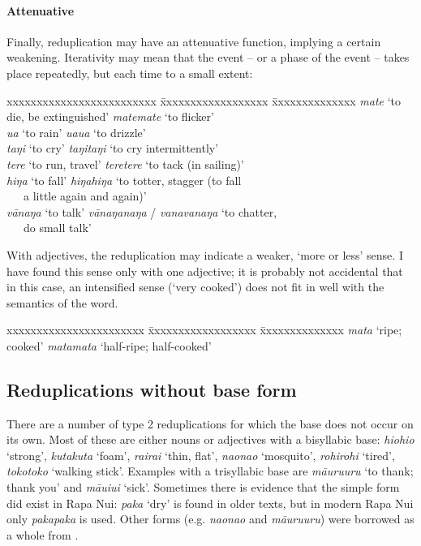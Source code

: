 \paragraph{Attenuative}\label{sec:2.6.2.2.7} Finally, reduplication may have an attenuative function, implying a certain weakening. Iterativity may mean that the event – or a phase of the event – takes place repeatedly, but each time to a small extent:
\ea 
\begin{tabbing}
 xxxxxxxxxxxxxxxxxxxxxxxxx \= xxxxxxxxxxxxxxxxxx \= xxxxxxxxxxxxxx \kill
  \textit{mate} ‘to die, be extinguished’ \> \textit{matemate} ‘to flicker’\\
  \textit{{\ꞌ}ua} ‘to rain’ \> \textit{{\ꞌ}ua{\ꞌ}ua} ‘to drizzle’\\
  \textit{taŋi} ‘to cry’ \> \textit{taŋitaŋi} ‘to cry intermittently’\\
  \textit{tere} ‘to run, travel’ \> \textit{teretere} ‘to tack (in sailing)’\\
  \textit{hiŋa} ‘to fall’  \>\textit{hiŋahiŋa} ‘to totter, stagger (to fall \\
 \> ~~~a little again and again)’\\
  \textit{vānaŋa} ‘to talk’ \> \textit{vānaŋanaŋa} / \textit{vanavanaŋa} ‘to chatter, \\
 \> ~~~do small talk’
\end{tabbing}
\z 
With adjectives, the reduplication may indicate a weaker, ‘more or less’ sense. I have found this sense only with one adjective; it is probably not accidental that in this case, an intensified sense (‘very cooked’) does not fit in well with the semantics of the word.

\ea 
\begin{tabbing}
xxxxxxxxxxxxxxxxxxxxxxx \= xxxxxxxxxxxxxxxxxx \= xxxxxxxxxxxxxx \kill
  \textit{mata} ‘ripe; cooked’ \> \textit{matamata} ‘half-ripe; half-cooked’
\end{tabbing}\z 
\subsection{Reduplications without base form}\label{sec:2.6.3}

There are a number of type 2 reduplications for which the base does not occur on its own. Most of these are either nouns or adjectives with a bisyllabic base: \textit{hiohio} ‘strong’, \textit{kutakuta} ‘foam’, \textit{rairai} ‘thin, flat’, \textit{naonao} ‘mosquito’, \textit{rohirohi} ‘tired’, \textit{tokotoko} ‘walking stick’. Examples with a trisyllabic base are \textit{māuruuru} ‘to thank; thank you’ and \textit{māuiui} ‘sick’. Sometimes there is evidence that the simple form did exist in Rapa Nui: \textit{paka} ‘dry’ is found in older texts, but in modern Rapa Nui only \textit{pakapaka} is used. Other forms (e.g. \textit{naonao} and \textit{māuruuru}) were borrowed as a whole from .

